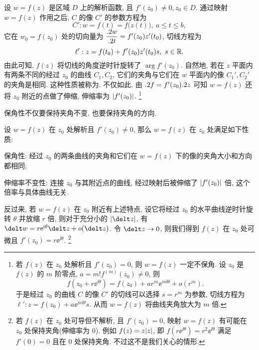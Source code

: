 设 $w=f(z)$ 是区域 $D$ 上的解析函数, 且 $f'(z_0)\neq 0,z_0\in D$.
通过映射 $w=f(z)$ 作用之后, $C$ 的像 $C'$ 的参数方程为
\[
  C':w=f(t)=f\bigl(z(t)\bigr),\ a\le t\le b,
\]
它在 $w_0=f(z_0)$ 处的切向量为 $\dfrac{.2 w}{.2 t}=f'(z_0) z'(t_0)$, 切线方程为
\[
  \ell': z=f(t_0)+f'(z_0) z'(t_0)s,\ s\in{\mathbb{R}}.
\]
由此可知, $f(z)$ 将切线的角度逆时针旋转了 $\arg f'(z_0)$.
自然地, 若在 $z$ 平面内有两条不同的经过 $z_0$ 的曲线 $C_1,C_2$, 它们的夹角与它们在 $w$ 平面内的像 $C_1',C_2'$ 的夹角是相同.
这种性质被称为.
不仅如此, 由 $.2 f=f'(z_0).2 z$ 可知 $w=f(z)$ 还将 $z_0$ 附近的点做了伸缩, 伸缩率为 $\lvert f'(z_0)\rvert$.
\footnote{
  若 $f(z)$ 在 $z_0$ 处解析且 $f'(z_0)=0$, 则 $w=f(z)$ 一定不保角.
  设 $z_0$ 是 $f(z)$ 的 $m$ 阶零点, $a=m!f^{(m)}(z_0)\neq 0$, 则
  \[
    f(z_0+r\ee^{\ii\theta})=f(z_0)+ar^m\ee^{m\ii\theta}+o(r^m).
  \]
  于是经过 $z_0$ 的曲线 $C$ 的像 $C'$ 的切线可以选择 $s=r^m$ 为参数, 切线方程为 $\ell':z=f(z_0)+a\ee^{m\ii\theta}s$.
  从而 $w=f(z)$ 将曲线夹角放大为 $m$ 倍.
}

\begin{marker}
  保角性不仅要保持夹角不变, 也要保持夹角的方向.
\end{marker}

\begin{theorem}
  \label{thm:analytic-nonzero-coformal}
  设 $w=f(z)$ 在 $z_0$ 处解析且 $f'(z_0)\neq0$, 那么 $w=f(z)$ 在 $z_0$ 处满足如下性质:
  \begin{enuma}
    \item 保角性: 经过 $z_0$ 的两条曲线的夹角和它们在 $w=f(z)$ 下的像的夹角大小和方向都相同;
    \item 伸缩率不变性: 连接 $z_0$ 与其附近点的曲线, 经过映射后被伸缩了 $\lvert f'(z_0)\rvert$ 倍, 这个倍率与具体曲线无关.\footnotemark
  \end{enuma}
\end{theorem}

反过来, 若 $w=f(z)$ 在 $z_0$ 附近有上述特点, 设它将经过 $z_0$ 的水平曲线逆时针旋转 $\theta$ 并放缩 $r$ 倍, 则对于充分小的 $\abs{\delt z}$, 有 $\delt w=r\ee^{\ii\theta}\delt z+o(\delt z)$.
令 $\delt z\ra 0$, 则我们得到 $f(z)$ 在 $z_0$ 处可微且 $f'(z_0)=r\ee^{\ii\theta}$.
\footnote{
  若 $f(z)$ 在 $z_0$ 处可导但不解析, 且 $f'(z_0)=0$, 映射 $w=f(z)$ 有可能在 $z_0$ 处保持夹角(伸缩率为 $0$).
  例如 $f(z)=z\lvert z\rvert$, 即 $f(r\ee^{\ii\theta})=r^2\ee^{\ii\theta}$ 满足 $f'(0)=0$ 且在 $0$ 处保持夹角.
  不过这不是我们关心的情形.
}


